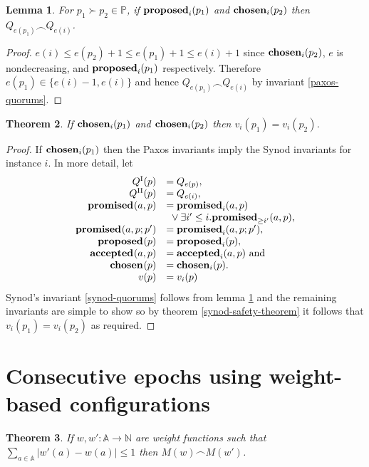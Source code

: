\documentclass[journal]{IEEEtran}
\newtheorem{theorem}{Theorem}
\newtheorem{lemma}[theorem]{Lemma}
\begin{document}
\begin{lemma}\label{paxos-synod-quorum-invariant} For $p_1 \succ p_2 \in
\mathbb P$, if $\mathbf{proposed}_{i}(p_1)$ and $\mathbf{chosen}_{i}(p_2)$ then ${Q_{e(p_1)} \frown
Q_{e(i)}}$.  \end{lemma}

\begin{proof} $e(i) \le e(p_2) + 1 \le e(p_1) + 1 \le e(i) + 1$ since
$\mathbf{chosen}_{i}(p_2)$, $e$ is nondecreasing, and $\mathbf{proposed}_{i}(p_1)$ respectively.
Therefore $e(p_1) \in \{ e(i) - 1, e(i) \}$ and hence ${Q_{e(p_1)} \frown
Q_{e(i)}}$ by invariant \ref{paxos-quorums}.  \end{proof}

\begin{theorem}\label{paxos-safety-theorem} If $\mathbf{chosen}_{i}(p_1)$ and
$\mathbf{chosen}_{i}(p_2)$ then ${v_i(p_1) = v_i(p_2)}$.  \end{theorem}

\begin{proof} If $\mathbf{chosen}_{i}(p_1)$ then the Paxos invariants imply the Synod
invariants for instance $i$.  In more detail, let
\[\begin{array}{rl}
Q^\textrm{I}(p) &= Q_{e(p)}, \\
Q^\textrm{II}(p) &= Q_{e(i)}, \\
\mathbf{promised}_{}(a,p) &= \mathbf{promised}_{i}(a,p) \\
& \ {}\vee \exists i' \le i. \mathbf{promised}_{\ge i'}(a,p), \\
\mathbf{promised}_{}(a,p;p') &= \mathbf{promised}_{i}(a,p;p'), \\
\mathbf{proposed}_{}(p) &= \mathbf{proposed}_{i}(p), \\
\mathbf{accepted}_{}(a,p) &= \mathbf{accepted}_{i}(a,p) \textrm{ and} \\
\mathbf{chosen}_{}(p) &= \mathbf{chosen}_{i}(p). \\
v(p) &= v_i(p)\\
\end{array}
\]
Synod's invariant \ref{synod-quorums} follows from lemma
\ref{paxos-synod-quorum-invariant} and the remaining invariants are simple to
show so by theorem \ref{synod-safety-theorem} it follows that $v_i(p_1) =
v_i(p_2)$ as required.  \end{proof}

\section{Consecutive epochs using weight-based configurations}

\begin{theorem} \label{weights-nearly-equal} If $w, w' : \mathbb A \to \mathbb
N$ are weight functions such that $\sum_{a \in \mathbb A} |w'(a) - w(a)| \le 1$
then $M(w) \frown M(w')$.  \end{theorem}
\end{document}
